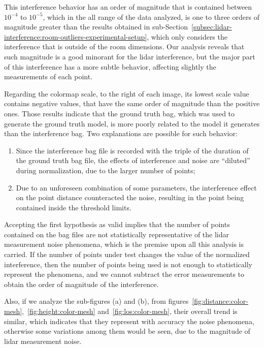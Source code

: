 This interference behavior has an order of magnitude that is contained between $10^{-4}$ to $10^{-5}$, which in the all range of the data analyzed, is one to three orders of magnitude greater than the results obtained in sub-Section~\ref{subsec:lidar-interference:room-outliers-experimental-setup}, which only considers the interference that is outside of the room dimensions. Our analysis reveals that such magnitude is a good minorant for the \ac{lidar} interference, but the major part of this interference has a more subtle behavior, affecting slightly the measurements of each point.

Regarding the colormap scale, to the right of each image, its lowest scale value contains negative values, that have the same order of magnitude than the positive ones. Those results indicate that the ground truth bag, which was used to generate the ground truth model, is more poorly related to the model it generates than the interference bag. Two explanations are possible for such behavior:

\begin{enumerate}
	\item Since the interference bag file is recorded with the triple of the duration of the ground truth bag file, the effects of interference and noise are ``diluted'' during normalization, due to the larger number of points;
	\item Due to an unforeseen  combination of some parameters, the interference effect on the point distance counteracted the noise, resulting in the point being contained inside the threshold limits.
\end{enumerate}

Accepting the first hypothesis as valid implies that the number of points contained on the bag files are not statistically representative of the \ac{lidar} measurement noise phenomena, which is the premise upon all this analysis is carried. If the number of points under test changes the value of the normalized interference, then the number of points being used is not enough to statistically represent the phenomena, and we cannot subtract the error measurements to obtain the order of magnitude of the interference.

Also, if we analyze the sub-figures (a) and (b), from figures~\ref{fig:distance:color-mesh},~\ref{fig:height:color-mesh} and~\ref{fig:los:color-mesh}, their overall trend is similar, which indicates that they represent with accuracy the noise phenomena, otherwise some variations among them would be seen, due to the magnitude of \ac{lidar} measurement noise.

